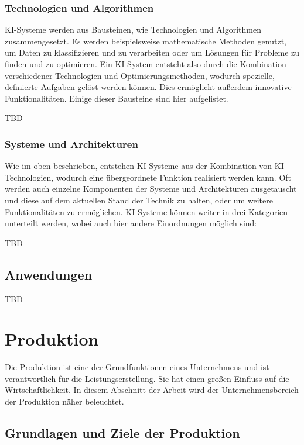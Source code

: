 \documentclass[a4paper,12pt, german]{report}
\begin{document}
\subsubsection{Technologien und Algorithmen}
KI-Systeme werden aus Bausteinen, wie Technologien und Algorithmen zusammengesetzt. Es werden beispielsweise mathematische Methoden genutzt, um Daten zu klassifizieren und zu verarbeiten oder um Lösungen für Probleme zu finden und zu optimieren. Ein KI-System entsteht also durch die Kombination verschiedener Technologien und Optimierungsmethoden, wodurch spezielle, definierte Aufgaben gelöst werden können. Dies ermöglicht außerdem innovative Funktionalitäten. Einige dieser Bausteine sind hier aufgelistet.

TBD

\subsubsection{Systeme und Architekturen}
Wie im oben beschrieben, entstehen KI-Systeme aus der Kombination von KI-Technologien, wodurch eine übergeordnete Funktion realisiert werden kann. Oft werden auch einzelne Komponenten der Systeme und Architekturen ausgetauscht und diese auf dem aktuellen Stand der Technik zu halten, oder um weitere Funktionalitäten zu ermöglichen. KI-Systeme können weiter in drei Kategorien unterteilt werden, wobei auch hier andere Einordnungen möglich sind:

TBD


\subsection{Anwendungen}
TBD


\section{Produktion}

Die Produktion ist eine der Grundfunktionen eines Unternehmens und ist verantwortlich für die Leistungserstellung. Sie hat einen großen Einfluss auf die Wirtschaftlichkeit. In diesem Abschnitt der Arbeit wird der Unternehmensbereich der Produktion näher beleuchtet.

\subsection{Grundlagen und Ziele der Produktion}
\end{document}

